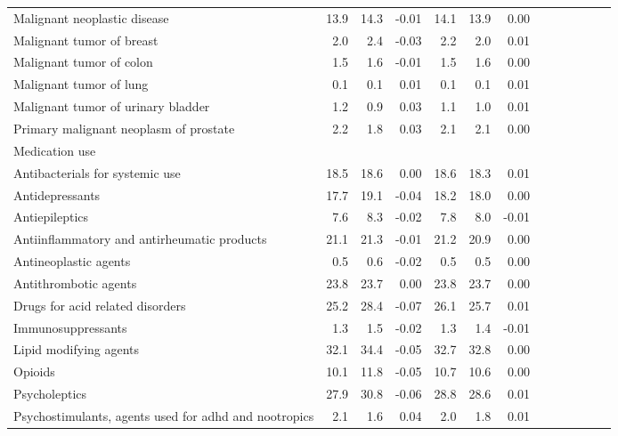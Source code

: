 \documentclass[11pt,]{article}
\begin{document}
\begin{longtable}{lrrrrrrrrrrrr}
      Malignant neoplastic disease & 13.9 &  14.3 & -0.01 & 14.1 &  13.9 &  0.00 \\ 
      Malignant tumor of breast &  2.0 &   2.4 & -0.03 &  2.2 &   2.0 &  0.01 \\ 
      Malignant tumor of colon &  1.5 &   1.6 & -0.01 &  1.5 &   1.6 &  0.00 \\ 
      Malignant tumor of lung &  0.1 &   0.1 &  0.01 &  0.1 &   0.1 &  0.01 \\ 
      Malignant tumor of urinary bladder &  1.2 &   0.9 &  0.03 &  1.1 &   1.0 &  0.01 \\ 
      Primary malignant neoplasm of prostate &  2.2 &   1.8 &  0.03 &  2.1 &   2.1 &  0.00 \\ 
  Medication use &    &     &     &    &     &     \\ 
      Antibacterials for systemic use & 18.5 &  18.6 &  0.00 & 18.6 &  18.3 &  0.01 \\ 
      Antidepressants & 17.7 &  19.1 & -0.04 & 18.2 &  18.0 &  0.00 \\ 
      Antiepileptics &  7.6 &   8.3 & -0.02 &  7.8 &   8.0 & -0.01 \\ 
      Antiinflammatory and antirheumatic products & 21.1 &  21.3 & -0.01 & 21.2 &  20.9 &  0.00 \\ 
      Antineoplastic agents &  0.5 &   0.6 & -0.02 &  0.5 &   0.5 &  0.00 \\ 
      Antithrombotic agents & 23.8 &  23.7 &  0.00 & 23.8 &  23.7 &  0.00 \\ 
      Drugs for acid related disorders & 25.2 &  28.4 & -0.07 & 26.1 &  25.7 &  0.01 \\ 
      Immunosuppressants &  1.3 &   1.5 & -0.02 &  1.3 &   1.4 & -0.01 \\ 
      Lipid modifying agents & 32.1 &  34.4 & -0.05 & 32.7 &  32.8 &  0.00 \\ 
      Opioids & 10.1 &  11.8 & -0.05 & 10.7 &  10.6 &  0.00 \\ 
      Psycholeptics & 27.9 &  30.8 & -0.06 & 28.8 &  28.6 &  0.01 \\ 
      Psychostimulants, agents used for adhd and nootropics &  2.1 &   1.6 &  0.04 &  2.0 &   1.8 &  0.01 \\ 
   \bottomrule\end{longtable}
\clearpage
{}
\end{document}
